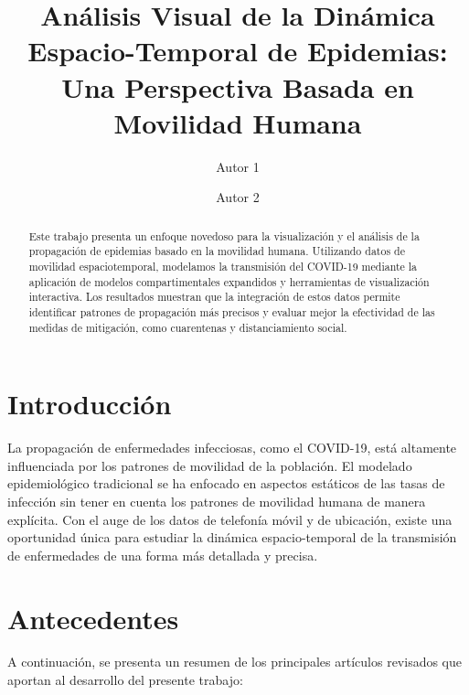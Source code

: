 \documentclass[sigconf]{acmart}
\title{Análisis Visual de la Dinámica Espacio-Temporal de Epidemias: Una Perspectiva Basada en Movilidad Humana}
\author{Autor 1}
\affiliation{
  \institution{Instituto de Investigación en Salud Pública}
  \city{Lima}
  \country{Perú}
}
\author{Autor 2}
\affiliation{
  \institution{Departamento de Ciencias Computacionales}
  \city{Arequipa}
  \country{Perú}
}
\begin{document}
\begin{abstract}
Este trabajo presenta un enfoque novedoso para la visualización y el análisis de la propagación de epidemias basado en la movilidad humana. Utilizando datos de movilidad espaciotemporal, modelamos la transmisión del COVID-19 mediante la aplicación de modelos compartimentales expandidos y herramientas de visualización interactiva. Los resultados muestran que la integración de estos datos permite identificar patrones de propagación más precisos y evaluar mejor la efectividad de las medidas de mitigación, como cuarentenas y distanciamiento social.
\end{abstract}


\maketitle

\section{Introducción}
La propagación de enfermedades infecciosas, como el COVID-19, está altamente influenciada por los patrones de movilidad de la población. El modelado epidemiológico tradicional se ha enfocado en aspectos estáticos de las tasas de infección sin tener en cuenta los patrones de movilidad humana de manera explícita. Con el auge de los datos de telefonía móvil y de ubicación, existe una oportunidad única para estudiar la dinámica espacio-temporal de la transmisión de enfermedades de una forma más detallada y precisa.

\section{Antecedentes}
A continuación, se presenta un resumen de los principales artículos revisados que aportan al desarrollo del presente trabajo:
\end{document}
